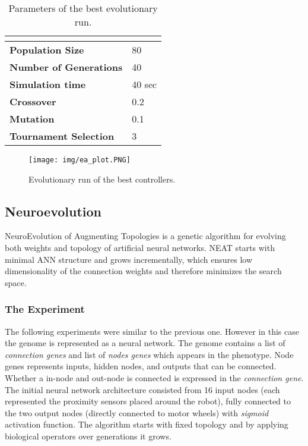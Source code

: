 \documentclass[format=acmsmall, review=false, screen=true]{acmart}
\begin{document}
\begin{table}[H]
\begin{tabular}{ll}
\hline
\textbf{}                      & \textbf{} \\ \hline
\textbf{Population Size}       & 80        \\
\textbf{Number of Generations} & 40        \\
\textbf{Simulation time}       & 40 sec    \\
\textbf{Crossover}             & 0.2       \\
\textbf{Mutation}              & 0.1       \\
\textbf{Tournament Selection}  & 3        
\end{tabular}
\caption{Parameters of the best evolutionary run.}
\label{table:experiment_2}
\end{table}

\begin{figure}[H]
  \texttt{[image: img/ea\_plot.PNG]}
  \caption{Evolutionary run of the best controllers.}
  \label{fig:ea_results}
\end{figure}

\subsection{Neuroevolution}

NeuroEvolution of Augmenting Topologies \cite{stanley2002evolving} is a genetic algorithm for evolving both weights and topology of artificial neural networks. NEAT starts with minimal ANN structure and grows incrementally, which ensures low dimensionality of the connection weights and therefore minimizes the search space.

\subsubsection{The Experiment}

The following experiments were similar to the previous one. However in this case the genome is represented as a neural network. The genome contains a list of \emph{connection genes} and list of \emph{nodes genes} which appears in the phenotype. Node genes represents inputs, hidden nodes, and outputs that can be connected. Whether a in-node and out-node is connected is expressed in the \emph{connection gene}. The initial neural network architecture consisted from 16 input nodes (each represented the proximity sensors placed around the robot), fully connected to the two output nodes (directly connected to motor wheels) with \emph{sigmoid} activation function. The algorithm starts with fixed topology and by applying biological operators over generations it grows. 
\end{document}
